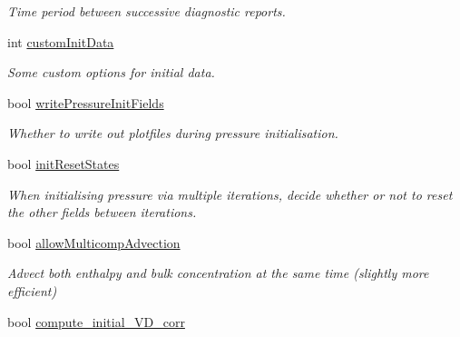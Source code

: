 \begin{DoxyCompactItemize}
\begin{DoxyCompactList}\small\item\em Time period between successive diagnostic reports. \end{DoxyCompactList}\item 
\mbox{\label{struct_mushy_layer_options_a1a59e6335baf5228d9e734a527039dff}} 
int \hyperlink{struct_mushy_layer_options_a1a59e6335baf5228d9e734a527039dff}{custom\+Init\+Data}
\begin{DoxyCompactList}\small\item\em Some custom options for initial data. \end{DoxyCompactList}\item 
bool \hyperlink{struct_mushy_layer_options_a7ed9632c43355a63ee6e4252145e5435}{write\+Pressure\+Init\+Fields}
\begin{DoxyCompactList}\small\item\em Whether to write out plotfiles during pressure initialisation. \end{DoxyCompactList}\item 
\mbox{\label{struct_mushy_layer_options_a33f4be9ba6bfcd9b3881eca0b053e7d3}} 
bool \hyperlink{struct_mushy_layer_options_a33f4be9ba6bfcd9b3881eca0b053e7d3}{init\+Reset\+States}
\begin{DoxyCompactList}\small\item\em When initialising pressure via multiple iterations, decide whether or not to reset the other fields between iterations. \end{DoxyCompactList}\item 
\mbox{\label{struct_mushy_layer_options_a4c801e1e1eb418e57b4a97a59332caa1}} 
bool \hyperlink{struct_mushy_layer_options_a4c801e1e1eb418e57b4a97a59332caa1}{allow\+Multicomp\+Advection}
\begin{DoxyCompactList}\small\item\em Advect both enthalpy and bulk concentration at the same time (slightly more efficient) \end{DoxyCompactList}\item 
\mbox{\label{struct_mushy_layer_options_a9bb223932eb426011810a4208c7f8750}} 
bool \hyperlink{struct_mushy_layer_options_a9bb223932eb426011810a4208c7f8750}{compute\+\_\+initial\+\_\+\+V\+D\+\_\+corr}

\end{DoxyCompactItemize}
